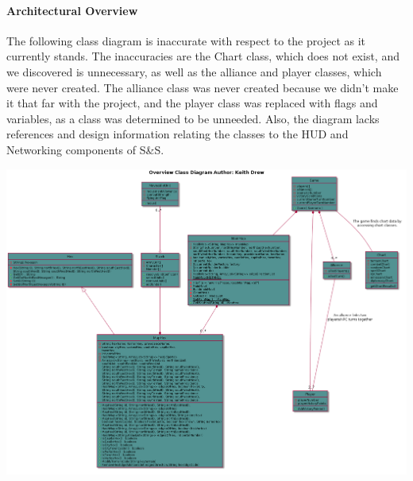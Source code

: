 \documentclass[12pt,a4paper,titlepage]{article}
\begin{document}
\paragraph{Architectural Overview}
The following class diagram is inaccurate with respect to the project as it currently stands. The inaccuracies are the Chart class, which does not exist, and we discovered is unnecessary, as well as the alliance and player classes, which were never created. The alliance class was never created because we didn't make it that far with the project, and the player class was replaced with flags and variables, as a class was determined to be unneeded. Also, the diagram lacks references and design information relating the classes to the HUD and Networking components of S\&S.
\begin{center}
\includegraphics[width=\linewidth]{overview.png}
\end{center}
\end{document}
